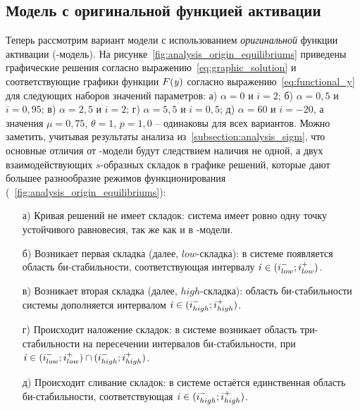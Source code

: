 \subsection{Модель с оригинальной функцией активации}  \label{subsection:analysis_origin}

Теперь рассмотрим вариант модели с использованием \textit{оригинальной} функции активации (-модель). На рисунке~\ref{fig:analysis_origin_equilibriums} приведены графические решения согласно выражению~\eqref{eq:graphic_solution} и соответствующие графики функции $F(\mathit{y})$ согласно выражению~\eqref{eq:functional_y} для следующих наборов значений параметров: а) $\alpha = 0  $ и $i =  2   $; б) $\alpha = 0,5$ и $i =  0,95$; в) $\alpha = 2,5$ и $i =  2   $; г) $\alpha = 5,5$ и $i =  0,5 $; д) $\alpha = 60 $ и $i = -20$, а значения  $\mu = 0,75$, $\theta = 1$, $p = 1,0$ -- одинаковы для всех вариантов. Можно заметить, учитывая результаты анализа из~\autoref{subsection:analysis_sigm}, что основные отличия от -модели будут следствием наличия не одной, а двух взаимодействующих $s$-образных складок в графике решений, которые дают большее разнообразие режимов функционирования (\seefigure~\ref{fig:analysis_origin_equilibriums}):
\begin{itemize}
    \item[а)] Кривая решений не имеет складок: система имеет ровно одну точку устойчивого равновесия, так же как и в -модели.
    \item[б)] Возникает первая складка (далее, $low$-складка): в системе появляется область би-стабильности, соответствующая интервалу $\mathit{i} \in (i_{low}^{-}; i_{low}^{+})$.
    \item[в)] Возникает вторая складка (далее, $high$-складка): область би-стабильности системы дополняется интервалом $\mathit{i} \in (i_{high}^{-}; i_{high}^{+})$.
    \item[г)] Происходит наложение складок: в системе возникает область три-стабильности на пересечении интервалов би-стабильности, \ie при $\mathit{i} \in (i_{low}^{-}; i_{low}^{+}) \cap (i_{high}^{-}; i_{high}^{+})$.
    \item[д)] Происходит сливание складок: в системе остаётся единственная область би-стабильности, соответствующая $\mathit{i} \in (i_{high}^{-}; i_{high}^{+})$.
\end{itemize}

